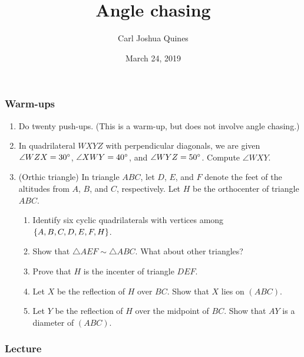 \documentclass[11pt,paper=letter]{scrartcl}
\begin{document}
\title{Angle chasing}
\author{Carl Joshua Quines}
\date{March 24, 2019}

\maketitle

\subsubsection*{Warm-ups}

\begin{enumerate}
  \item Do twenty push-ups. (This is a warm-up, but does not involve angle chasing.)

  \item In quadrilateral $WXYZ$ with perpendicular diagonals, we are given $\angle WZX = 30^\circ$, $\angle XWY = 40^\circ$, and $\angle WYZ = 50^\circ$. Compute $\angle WXY$.

  \item (Orthic triangle) In triangle $ABC$, let $D$, $E$, and $F$ denote the feet of the altitudes from $A$, $B$, and $C$, respectively. Let $H$ be the orthocenter of triangle $ABC$.
  \begin{enumerate}
    \item Identify six cyclic quadrilaterals with vertices among $\left\{ A, B, C, D, E, F, H \right\}$.

    \item Show that $\triangle AEF \sim \triangle ABC$. What about other triangles?

    \item Prove that $H$ is the incenter of triangle $DEF$. 

    \item Let $X$ be the reflection of $H$ over $BC$. Show that $X$ lies on $(ABC)$.

    \item Let $Y$ be the reflection of $H$ over the midpoint of $BC$. Show that $AY$ is a diameter of $(ABC)$.
  \end{enumerate}
\end{enumerate}

\subsubsection*{Lecture}
\end{document}

